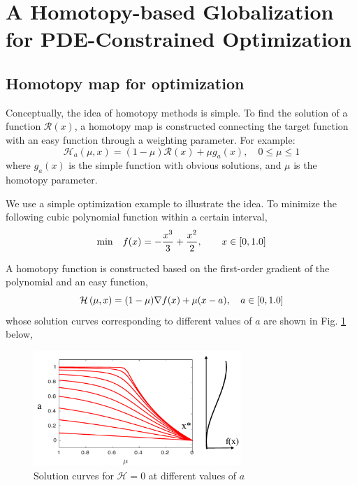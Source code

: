 \documentclass{article}
\theoremstyle{definition}
\begin{document}
\section{A Homotopy-based Globalization for PDE-Constrained Optimization}

\subsection{Homotopy map for optimization}
Conceptually, the idea of homotopy methods is simple. To find the solution of a function $\mathcal{R}(x)$, a homotopy map is constructed connecting the target function with an easy function through a weighting parameter. For example:
\begin{equation*}
\mathcal{H}_a\left(\mu, x\right) = (1-\mu) \mathcal{R}(x) + \mu g_a(x), \quad 0 \leq \mu \leq 1
\end{equation*}
where $g_a(x)$ is the simple function with obvious solutions, and $\mu$ is the homotopy parameter. 

We use a simple optimization example to illustrate the idea. To minimize the following cubic polynomial function within a certain interval, 
\begin{equation*}
\text{min}  \quad  f(x) = -\frac{x^3}{3} + \frac{x^2}{2},  \qquad  x \in [0, 1.0]\\
\end{equation*}


A homotopy function is constructed based on the first-order gradient of the polynomial and an easy function, 
\begin{equation*}
\mathcal{H} \left(\mu, x\right) = (1-\mu) \nabla f(x) + \mu (x-a), \quad a \in [0, 1.0] \\
\end{equation*}
whose solution curves corresponding to different values of $a$ are shown in Fig. \ref{fig:zc} below,
\begin{figure}[H]
  \centering
  \includegraphics[width=0.7\textwidth]{./figs/zero_curve.pdf}
  \caption{Solution curves for $\mathcal{H}=0$ at different values of $a$}
  \label{fig:zc}
\end{figure}
\end{document}
